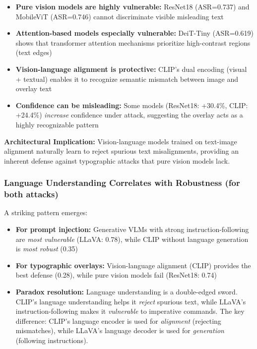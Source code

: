 \documentclass[11pt]{article}
\begin{document}
\begin{itemize}[leftmargin=2em]
    \item \textbf{Pure vision models are highly vulnerable:} ResNet18 (ASR=0.737) and MobileViT (ASR=0.746) cannot discriminate visible misleading text
    \item \textbf{Attention-based models especially vulnerable:} DeiT-Tiny (ASR=0.619) shows that transformer attention mechanisms prioritize high-contrast regions (text edges)
    \item \textbf{Vision-language alignment is protective:} CLIP's dual encoding (visual + textual) enables it to recognize semantic mismatch between image and overlay text
    \item \textbf{Confidence can be misleading:} Some models (ResNet18: +30.4\%, CLIP: +24.4\%) \emph{increase} confidence under attack, suggesting the overlay acts as a highly recognizable pattern
\end{itemize}

\textbf{Architectural Implication:} Vision-language models trained on text-image alignment naturally learn to reject spurious text misalignments, providing an inherent defense against typographic attacks that pure vision models lack.

\subsubsection{Language Understanding Correlates with Robustness (for both attacks)}

A striking pattern emerges:
\begin{itemize}[leftmargin=2em]
    \item \textbf{For prompt injection:} Generative VLMs with strong instruction-following are \emph{most vulnerable} (LLaVA: 0.78), while CLIP without language generation is \emph{most robust} (0.35)
    \item \textbf{For typographic overlays:} Vision-language alignment (CLIP) provides the best defense (0.28), while pure vision models fail (ResNet18: 0.74)
    \item \textbf{Paradox resolution:} Language understanding is a double-edged sword. CLIP's language understanding helps it \emph{reject} spurious text, while LLaVA's instruction-following makes it \emph{vulnerable} to imperative commands. The key difference: CLIP's language encoder is used for \emph{alignment} (rejecting mismatches), while LLaVA's language decoder is used for \emph{generation} (following instructions).
\end{itemize}
\end{document}
